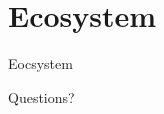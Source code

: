 \documentclass[10pt]{beamer}
\begin{document}
\section{Ecosystem}
\begin{frame}{Eocsystem}
\end{frame}
\begin{frame}{Questions?}
\end{frame}
\end{document}
